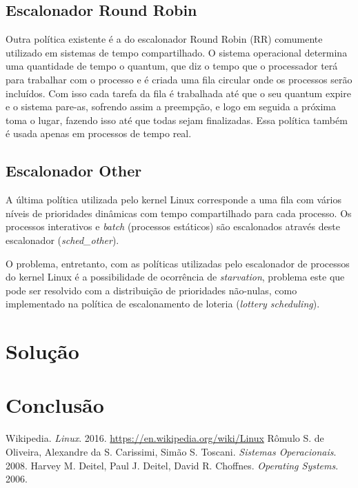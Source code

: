\documentclass[a4paper,12pt]{article}
\begin{document}
\subsection{Escalonador Round Robin}
Outra política existente é a do escalonador Round Robin (RR) comumente utilizado em sistemas de tempo compartilhado. O sistema operacional determina uma quantidade de tempo o quantum, que diz o tempo que o processador terá para trabalhar com o processo e é criada uma fila circular onde os processos serão incluídos. Com isso cada tarefa da fila é trabalhada até que o seu quantum expire e o sistema pare-as, sofrendo assim a preempção, e logo em seguida a próxima toma o lugar, fazendo isso até que todas sejam finalizadas. Essa política também é usada apenas em processos de tempo real. \cite{Deitel2006}

\subsection{Escalonador Other}
A última política utilizada pelo kernel Linux corresponde a uma fila com vários níveis de prioridades dinâmicas com tempo compartilhado para cada processo. Os processos interativos e \emph{batch} (processos estáticos) são escalonados através deste escalonador (\emph{sched\_other}).

\pagebreak

O problema, entretanto, com as políticas utilizadas pelo escalonador de processos do kernel Linux é a possibilidade de ocorrência de \emph{starvation}, problema este que pode ser resolvido com a distribuição de prioridades não-nulas, como implementado na política de escalonamento de loteria (\emph{lottery scheduling}).

\section{Solução}

\section{Conclusão}

\begin{thebibliography}{9}
 Wikipedia. \emph{Linux}. 2016. \url{https://en.wikipedia.org/wiki/Linux}
 Rômulo S. de Oliveira, Alexandre da S. Carissimi, Simão S. Toscani. \emph{Sistemas Operacionais}. 2008.
 Harvey M. Deitel, Paul J. Deitel, David R. Choffnes. \emph{Operating Systems}. 2006.
\end{thebibliography}
\end{document}
